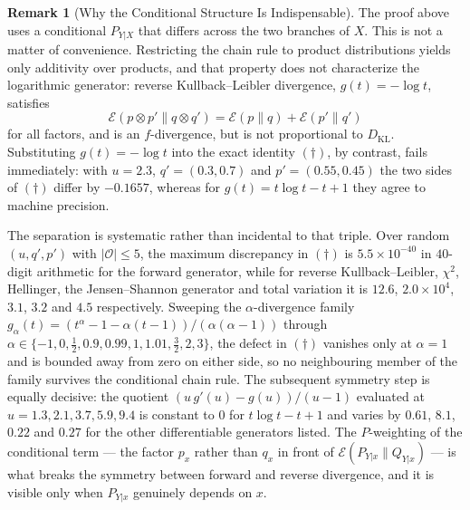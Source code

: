 \documentclass[12pt]{article}
\theoremstyle{definition}
\newtheorem{remark}[theorem]{Remark}
\begin{document}
\begin{remark}[Why the Conditional Structure Is Indispensable]
\label{rem:csiszar-conditional-needed}
The proof above uses a conditional $P_{Y|X}$ that differs across the two
branches of $X$.  This is not a matter of convenience.  Restricting the chain
rule to product distributions yields only additivity over products, and that
property does not characterize the logarithmic generator: reverse
Kullback--Leibler divergence, $g(t)=-\log t$, satisfies
\[
\mathcal E(p\otimes p'\|q\otimes q')=\mathcal E(p\|q)+\mathcal E(p'\|q')
\]
for all factors, and is an $f$-divergence, but is not proportional to
$D_{\mathrm{KL}}$.  Substituting $g(t)=-\log t$ into the exact identity
$(\dagger)$, by contrast, fails immediately: with $u=2.3$,
$q'=(0.3,0.7)$ and $p'=(0.55,0.45)$ the two sides of $(\dagger)$ differ by
$-0.1657$, whereas for $g(t)=t\log t-t+1$ they agree to machine precision.

The separation is systematic rather than incidental to that triple.  Over
random $(u,q',p')$ with $|\mathcal O|\le5$, the maximum discrepancy in
$(\dagger)$ is $5.5\times10^{-40}$ in $40$-digit arithmetic for the forward
generator, while for reverse Kullback--Leibler, $\chi^2$, Hellinger, the
Jensen--Shannon generator and total variation it is $12.6$, $2.0\times10^4$,
$3.1$, $3.2$ and $4.5$ respectively.  Sweeping the $\alpha$-divergence family
$g_\alpha(t)=(t^\alpha-1-\alpha(t-1))/(\alpha(\alpha-1))$ through
$\alpha\in\{-1,0,\tfrac12,0.9,0.99,1,1.01,\tfrac32,2,3\}$, the defect in
$(\dagger)$ vanishes only at $\alpha=1$ and is bounded away from zero on either
side, so no neighbouring member of the family survives the conditional chain
rule.  The subsequent symmetry step is equally decisive: the quotient
$(u\,g'(u)-g(u))/(u-1)$ evaluated at $u=1.3,2.1,3.7,5.9,9.4$ is constant to
$0$ for $t\log t-t+1$ and varies by $0.61$, $8.1$, $0.22$ and $0.27$ for the
other differentiable generators listed.
The $P$-weighting of the conditional term --- the factor $p_x$ rather than
$q_x$ in front of $\mathcal E(P_{Y|x}\|Q_{Y|x})$ --- is what breaks the
symmetry between forward and reverse divergence, and it is visible only when
$P_{Y|x}$ genuinely depends on $x$.
\end{remark}
\end{document}
